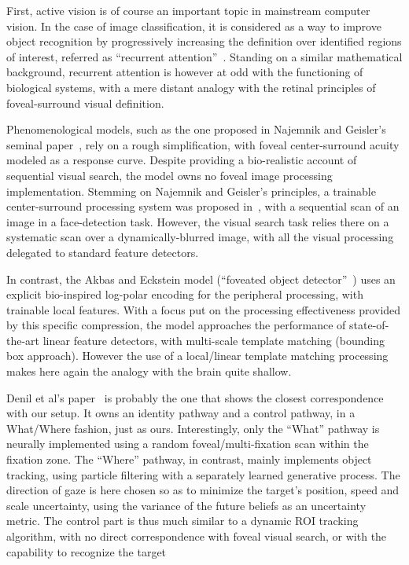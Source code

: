 First, active vision is of course an important topic in mainstream computer vision. In the case of image classification, it is considered as a way to improve object recognition by progressively increasing the definition over identified regions of interest, referred as ``recurrent attention''~\cite{mnih2014recurrent,fu2017look}. Standing on a similar mathematical background, recurrent attention is however at odd with the functioning of biological systems, with a mere distant analogy with the retinal principles of foveal-surround visual definition.

Phenomenological models, such as the one proposed in Najemnik and Geisler's seminal paper~\cite{Najemnik05}, rely on a rough simplification, with foveal center-surround acuity modeled as a response curve. Despite providing a bio-realistic account of sequential visual search, the model owns no foveal image processing implementation. Stemming on Najemnik and Geisler's principles, a trainable center-surround processing system was proposed in~\cite{Butko2010infomax}, with a sequential scan of an image in a face-detection task. However, the visual search task relies there on a systematic scan over a dynamically-blurred image, with all the visual processing delegated to standard feature detectors.

In contrast, the Akbas and Eckstein model (“foveated object detector”~\cite{akbas2017object}) uses an explicit bio-inspired log-polar encoding
for the peripheral processing, with trainable local features.
With a focus put on the processing effectiveness provided by this specific compression,
the model approaches the performance of state-of-the-art linear feature detectors, with multi-scale template matching (bounding box approach). However the use of
a local/linear template matching processing makes here again the analogy with the brain quite shallow.

Denil et al's paper~\cite{denil2012learning} is probably the one that shows the closest correspondence with our setup. It owns an identity pathway and a control pathway, in a What/Where fashion, just as ours. Interestingly, only the ``What'' pathway is neurally implemented using a random foveal/multi-fixation scan within the fixation zone. The ``Where'' pathway, in contrast, mainly implements object tracking, using particle filtering with a separately learned generative process. The direction of gaze is here chosen so as to minimize the target's position, speed and scale uncertainty, using the variance of the future beliefs as an uncertainty metric. The control part is thus much similar to a dynamic ROI tracking algorithm, with no direct correspondence with foveal visual search, or with the capability to recognize the target
%
